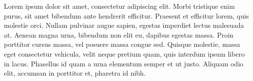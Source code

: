 \documentclass[11pt,a5paper]{book}
\begin{document}
	
	\fontsize{8}{8}
	\normalsize
	
	Lorem ipsum dolor sit amet, consectetur adipiscing elit. Morbi tristique enim purus, sit amet bibendum ante hendrerit efficitur. Praesent et efficitur lorem, quis molestie orci. Nullam pulvinar augue sapien, egestas imperdiet lectus malesuada at. Aenean magna urna, bibendum non elit eu, dapibus egestas massa. Proin porttitor cursus massa, vel posuere massa congue sed. Quisque molestie, massa eget consectetur vehicula, velit neque pretium quam, quis interdum ipsum libero in lacus. Phasellus id quam a urna elementum semper et ut justo. Aliquam odio elit, accumsan in porttitor et, pharetra id nibh.
\end{document}
